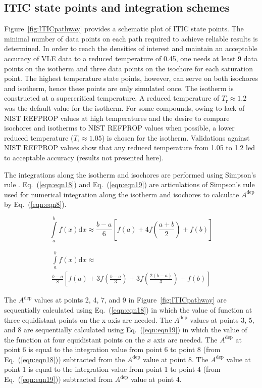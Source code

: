 \documentclass[5p,times]{elsarticle}
\begin{document}
\subsection{ITIC state points and integration schemes}\label{sec:ITIC-state-points}
Figure~\ref{fig:ITICpathway} provides a schematic plot of ITIC state points. The minimal number of data points on each path required to achieve reliable results is determined. In order to reach the densities of interest and maintain an acceptable accuracy of VLE data to a reduced temperature of 0.45, one needs at least 9 data points on the isotherm and three data points on the isochore for each saturation point. The highest temperature state points, however, can serve on both isochores and isotherm, hence these points are only simulated once. The isotherm is constructed at a supercritical temperature. A reduced temperature of $T_\mathrm{r} \approx 1.2$ was the default value for the isotherm. For some compounds, owing to lack of NIST REFPROP values at high temperatures and the desire to compare isochores and isotherms to NIST REFPROP values when possible, a lower reduced temperature ($T_\mathrm{r} \approx 1.05$) is chosen for the isotherm. Validations against NIST REFPROP values show that any reduced temperature from 1.05 to 1.2 led to acceptable accuracy (results not presented here).


The integrations along the isotherm and isochores are performed using Simpson's rule \cite{atkinson2008}. Eq.~(\ref{eqn:eqn18}) and Eq.~(\ref{eqn:eqn19}) are
articulations of Simpson's rule used for numerical integration along the isotherm and isochores to calculate $A^{\mathrm{dep}}$ by Eq.~(\ref{eqn:eqn8}).

\begin{equation}
\int\limits_a^b {f(x)\mathrm{d} x \approx \frac{{b - a}}{6}} \left[ {f(a) + 4f \left( \frac{{a + b}}{2} \right) + f(b)} \right] \label{eqn:eqn18}
\end{equation}

\begin{equation}
\begin{array}{l}
{\int\limits_a^b f(x)\mathrm{d}x \approx }
\\ 
{{\frac{{b - a}}{8} \left[ {f(a) + 3f \left( \frac{{b - a}}{3} \right) + 3f \left( \frac{{2(b - a)}}{3} \right) + f(b)} \right]}}  
\end{array}
\label{eqn:eqn19}
\end{equation}

The $A^{\mathrm{dep}}$ values at points 2, 4, 7, and 9 in Figure~\ref{fig:ITICpathway} are sequentially calculated using Eq.~(\ref{eqn:eqn18}) in which the value of function at three equidistant points on the x-axis are needed. The $A^{\mathrm{dep}}$ values at points 3, 5, and 8 are sequentially calculated using Eq.~(\ref{eqn:eqn19}) in which the value of the function at four equidistant points on the $x$ axis are needed. The $A^{\mathrm{dep}}$ at point 6 is equal to the integration value from point 6 to point 8 (from Eq.~(\ref{eqn:eqn18})) subtracted from the $A^{\mathrm{dep}}$ value at point 8. The $A^{\mathrm{dep}}$ value at point 1 is equal to the integration value from point 1 to point 4 (from Eq.~(\ref{eqn:eqn19})) subtracted from $A^{\mathrm{dep}}$ value at point 4. 
\end{document}

